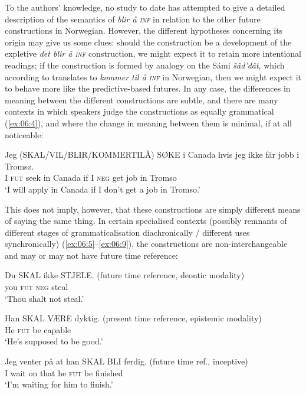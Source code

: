 \documentclass[output=paper,colorlinks,citecolor=brown]{langscibook}
\begin{document}
To the authors' knowledge, no study to date has attempted to give a detailed description of the semantics of \textit{blir å \textsc{inf}} in relation to the other future constructions in Norwegian. However, the different hypotheses concerning its origin may give us some clues: should the construction be a development of the expletive \textit{det blir å \textsc{inf}} construction, we might expect it to retain more intentional readings; if the construction is formed by analogy on the Sámi \textit{šâd’dât}, which according to \citet{nielsen1926} translates to \textit{kommer til å \textsc{inf}} in Norwegian, then we might expect it to behave more like the predictive-based futures. In any case, the differences in meaning between the different constructions are subtle, and there are many contexts in which speakers judge the constructions as equally grammatical (\ref{ex:06:4}), and where the change in meaning between them is minimal, if at all noticeable:

\ea\label{ex:06:4}
\gll Jeg (SKAL/VIL/BLIR/KOMMERTILÅ) SØKE i Canada hvis jeg ikke
får jobb i Tromsø.\\
     I \textsc{fut} seek in Canada if I \textsc{neg} get job in Tromso\\
\glt ‘I will apply in Canada if I don’t get a job in Tromso.’
\z

This does not imply, however, that these constructions are simply different means of saying the same thing. In certain specialised contexts (possibly remnants of different stages of grammaticalisation diachronically / different uses synchronically) (\ref{ex:06:5}--\ref{ex:06:9}), the constructions are non-interchangeable and may or may not have future time reference:

\ea\label{ex:06:5}
\gll Du SKAL ikke STJELE. (future time reference, deontic modality)\\
     you \textsc{fut} \textsc{neg} steal\\
\glt ‘Thou shalt not steal.’
\z

\ea\label{ex:06:6}
\gll Han SKAL VÆRE dyktig. (present time reference, epistemic
modality)\\
     He \textsc{fut} be capable\\
\glt ‘He’s supposed to be good.’
\z

\ea\label{ex:06:7}
\gll Jeg venter på at han SKAL BLI ferdig. (future time ref., inceptive)\\
     I wait on that he \textsc{fut} be finished\\
\glt ‘I'm waiting for him to finish.’
\z
\end{document}
